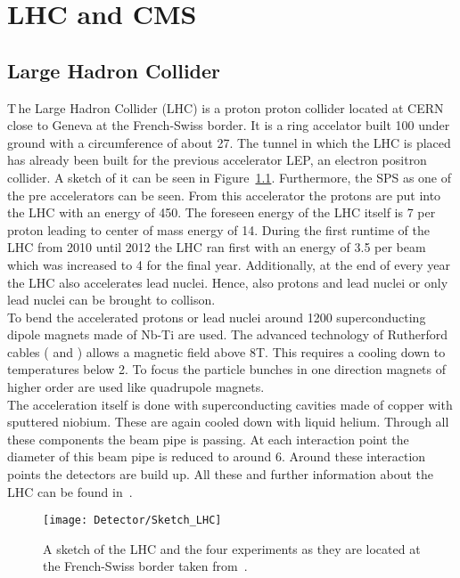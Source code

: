 \chapter{LHC and CMS \label{sec:LHCCMS}}

\section{Large Hadron Collider \label{LHCCMSLHC}}

\lettrine[lines=2]{T}{\,}he Large Hadron Collider (LHC) is a proton proton collider located at CERN close to Geneva at the French-Swiss border. It is a ring accelator built 100\m{} under ground with a circumference of about 27\km{}. The tunnel in which the LHC is placed has already been built for the previous accelerator LEP, an electron positron collider. A sketch of it can be seen in Figure~\ref{plot:LCHSketch}. Furthermore, the SPS as one of the pre accelerators can be seen. From this accelerator the protons are put into the LHC with an energy of 450\GeV{}. The foreseen energy of the LHC itself is 7\TeV{} per proton leading to center of mass energy of 14\TeV{}. During the first runtime of the LHC from 2010 until 2012 the LHC ran first with an energy of 3.5\TeV{} per beam which was increased to 4\TeV{} for the final year. Additionally, at the end of every year the LHC also accelerates lead nuclei. Hence, also protons and lead nuclei or only lead nuclei can be brought to collison. \\
To bend the accelerated protons or lead nuclei around 1200 superconducting dipole magnets made of Nb-Ti are used. The advanced technology of Rutherford cables (\cite{RuthCables1} and \cite{RuthCables2}) allows a magnetic field above 8\unit{T}. This requires a cooling down to temperatures below 2\K{}. To focus the particle bunches in one direction magnets of higher order are used like quadrupole magnets. \\
The acceleration itself is done with superconducting cavities made of copper with sputtered niobium. These are again cooled down with liquid helium. Through all these components the beam pipe is passing. At each interaction point the diameter of this beam pipe is reduced to around 6\cm{}. Around these interaction points the detectors are build up. All these and further information about the LHC can be found in~.

\begin{figure}[!ht]
  \centering
  \texttt{[image: Detector/Sketch\_LHC]}
  \caption[Sketch of the LHC]{A sketch of the LHC and the four experiments as they are located at the French-Swiss border taken from~\cite{Team:40525}. \label{plot:LCHSketch}}
\end{figure}

